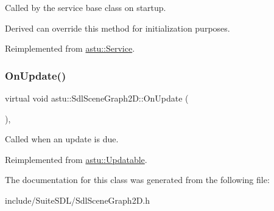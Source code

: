 Called by the service base class on startup.

Derived can override this method for initialization purposes. 

Reimplemented from \hyperlink{classastu_1_1Service_a357dc663e000b1f086f681ec3c459bfe}{astu\+::\+Service}.

\mbox{\label{classastu_1_1SdlSceneGraph2D_add3a6e67064379389068659addad0920}} 
\subsubsection{\texorpdfstring{On\+Update()}{OnUpdate()}}
{\footnotesize\ttfamily virtual void astu\+::\+Sdl\+Scene\+Graph2\+D\+::\+On\+Update (\begin{DoxyParamCaption}{ }\end{DoxyParamCaption})\hspace{0.3cm}{\ttfamily [override]}, {\ttfamily [virtual]}}

Called when an update is due. 

Reimplemented from \hyperlink{classastu_1_1Updatable_a925566c9770b95895c6c7294f9d51528}{astu\+::\+Updatable}.



The documentation for this class was generated from the following file\+:\begin{DoxyCompactItemize}
\item 
include/\+Suite\+S\+D\+L/Sdl\+Scene\+Graph2\+D.\+h\end{DoxyCompactItemize}
